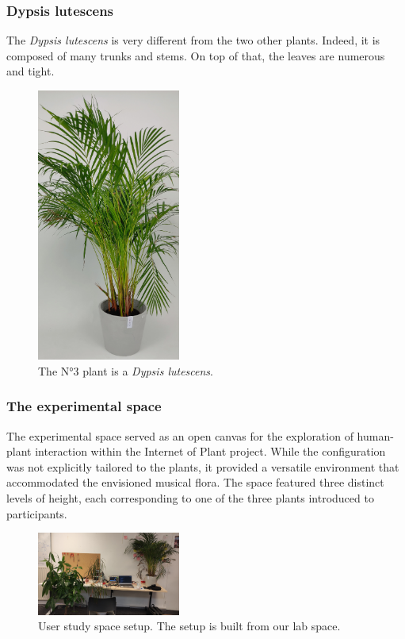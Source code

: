 \newpage

\subsubsection{Dypsis lutescens}

The \textit{Dypsis lutescens} is very different from the two other plants. Indeed, it is composed of many trunks and stems. On top of that, the leaves are numerous and tight.

\begin{figure}[h!]
    \centering
    \includegraphics[width=0.42\textwidth, angle=-90]{Images/fougere_plant.jpg}
    \caption{The N°3 plant is a \textit{Dypsis lutescens}.}
    
    \vspace{-0.5cm}
    \label{fig:fougere_plant}
    \vspace{0.2cm}
\end{figure}



\subsubsection{The experimental space}

The experimental space served as an open canvas for the exploration of human-plant interaction within the Internet of Plant project. While the configuration was not explicitly tailored to the plants, it provided a versatile environment that accommodated the envisioned musical flora. The space featured three distinct levels of height, each corresponding to one of the three plants introduced to participants. 

\begin{figure}[h]
    \centering
    \includegraphics[width=0.42\textwidth]{Images/setup_user_study.jpg}
    \caption{User study space setup. The setup is built from our lab space.}
    
    \vspace{-0.5cm}
    \label{fig:setup_user_study}
    \vspace{0.2cm}
\end{figure}

\newpage

